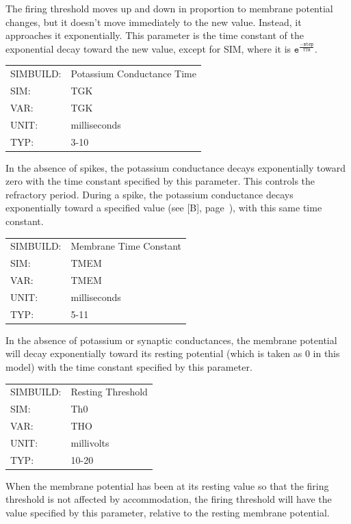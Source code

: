 \documentclass[12pt,openany,oneside]{book}
\newcommand{\tmcode}[1]{\mathtt{#1}}
\newcommand{\tipxref}[1]{see [#1], page~\pageref{#1}}
\begin{document}
\noindent
The firing threshold moves up and down in proportion to membrane
potential changes, but it doesn't move immediately to the new value.
Instead, it approaches it exponentially. This parameter is the time
constant of the exponential decay toward the new value, except for
SIM, where it is $\tmcode{e^{\tfrac{-step}{TTH}}}$.
\filbreak
\vspace{\baselineskip}

\label{TGK}
\begin{flushleft}
\begin{tabular}{@{}ll@{}}
SIMBUILD:  &  Potassium Conductance Time\\
SIM:  &  TGK\\
VAR:  &  TGK\\
UNIT:  &  milliseconds\\
TYP:  &  3-10\\
\end{tabular}
\end{flushleft}

\noindent
In the absence of spikes, the potassium conductance decays
exponentially toward zero with the time constant specified by this
parameter. This controls the refractory period. During a spike, the
potassium conductance decays exponentially toward a specified value
(\tipxref{B}), with this same time constant.
\filbreak
\vspace{\baselineskip}

\label{TMEM}
\begin{flushleft}
\begin{tabular}{@{}ll@{}}
SIMBUILD: & Membrane Time Constant\\
SIM: & TMEM\\
VAR: & TMEM\\
UNIT: & milliseconds\\
TYP: & 5-11\\
\end{tabular}
\end{flushleft}
\noindent
In the absence of potassium or synaptic conductances, the membrane
potential will decay exponentially toward its resting potential (which
is taken as 0 in this model) with the time constant specified by this
parameter.
\filbreak
\vspace{\baselineskip}

\begin{flushleft}
\begin{tabular}{@{}ll@{}}
SIMBUILD: & Resting Threshold\\
SIM: & Th0\\
VAR: & THO\\
UNIT: & millivolts\\
TYP: & 10-20\\
\end{tabular}
\end{flushleft}
\noindent
When the membrane potential has been at its resting value so that the
firing threshold is not affected by accommodation, the firing
threshold will have the value specified by this parameter, relative to
the resting membrane potential.
\filbreak
\vspace{\baselineskip}
\end{document}
